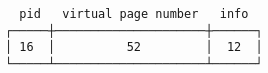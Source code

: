 \documentclass[varwidth,crop]{standalone}
\begin{document}
\begin{verbatim}
  pid   virtual page number   info
┌─────┼─────────────────────┼──────┐
│ 16  │          52         │  12  │
└─────┴─────────────────────┴──────┘
\end{verbatim}
\end{document}
